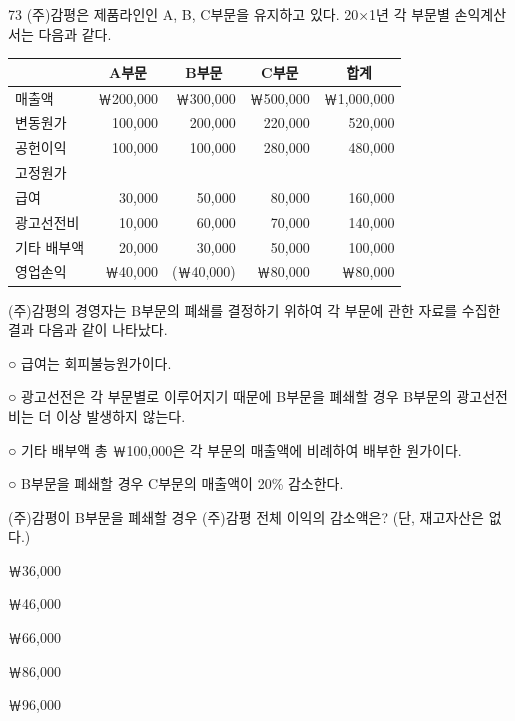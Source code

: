 \begin{question}{73}
(주)감평은 제품라인인 A, B, C부문을 유지하고 있다. 20×1년 각 부문별 손익계산서는 다음과 같다.

{\small\centering\begin{tabular}{|l|r|r|r|r|}\hline
 & \multicolumn{1}{c|}{A부문} & \multicolumn{1}{c|}{B부문} & \multicolumn{1}{c|}{C부문} & \multicolumn{1}{c|}{합계} \\ \hline
매출액 & ￦200,000 & ￦300,000 & ￦500,000 & ￦1,000,000 \\
변동원가 & 100,000 & 200,000 & 220,000 & 520,000 \\ \hline
공헌이익 & 100,000 & 100,000 & 280,000 & 480,000 \\
고정원가 & & & & \\
\hspace{1em}급여 & 30,000 & 50,000 & 80,000 & 160,000 \\
\hspace{1em}광고선전비 & 10,000 & 60,000 & 70,000 & 140,000 \\
\hspace{1em}기타 배부액 & 20,000 & 30,000 & 50,000 & 100,000 \\ \hline
영업손익 & ￦40,000 & (￦40,000) & ￦80,000 & ￦80,000 \\ \hline
\end{tabular}\par}
\vspace{4pt}
(주)감평의 경영자는 B부문의 폐쇄를 결정하기 위하여 각 부문에 관한 자료를 수집한 결과 다음과 같이 나타났다.
\begin{framedtext}
○ 급여는 회피불능원가이다. \par
○ 광고선전은 각 부문별로 이루어지기 때문에 B부문을 폐쇄할 경우 B부문의 광고선전비는 더 이상 발생하지 않는다. \par
○ 기타 배부액 총 ￦100,000은 각 부문의 매출액에 비례하여 배부한 원가이다. \par
○ B부문을 폐쇄할 경우 C부문의 매출액이 20\%  감소한다. \par
\end{framedtext}
(주)감평이 B부문을 폐쇄할 경우 (주)감평 전체 이익의 감소액은? (단, 재고자산은 없다.)
\begin{choices}
  \item ￦36,000
  \item ￦46,000
  \item ￦66,000
  \item ￦86,000
  \item ￦96,000
\end{choices}
\end{question}

